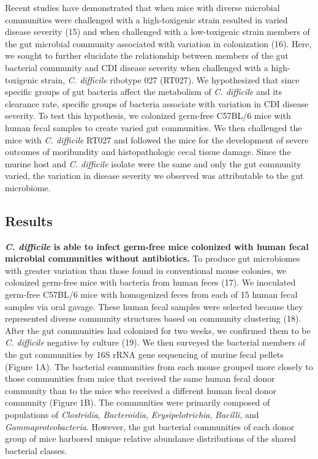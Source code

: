 \documentclass[
  12pt,
]{article}
\begin{document}
Recent studies have demonstrated that when mice with diverse microbial
communities were challenged with a high-toxigenic strain resulted in
varied disease severity (15) and when challenged with a low-toxigenic
strain members of the gut microbial community associated with variation
in colonization (16). Here, we sought to further elucidate the
relationship between members of the gut bacterial community and CDI
disease severity when challenged with a high-toxigenic strain, \emph{C.
difficile} ribotype 027 (RT027). We hypothesized that since specific
groups of gut bacteria affect the metabolism of \emph{C. difficile} and
its clearance rate, specific groups of bacteria associate with variation
in CDI disease severity. To test this hypothesis, we colonized germ-free
C57BL/6 mice with human fecal samples to create varied gut communities.
We then challenged the mice with \emph{C. difficile} RT027 and followed
the mice for the development of severe outcomes of moribundity and
histopathologic cecal tissue damage. Since the murine host and \emph{C.
difficile} isolate were the same and only the gut community varied, the
variation in disease severity we observed was attributable to the gut
microbiome.

\hypertarget{results}{%
\subsection{Results}\label{results}}

\textbf{\emph{C. difficile} is able to infect germ-free mice colonized
with human fecal microbial communities without antibiotics.} To produce
gut microbiomes with greater variation than those found in conventional
mouse colonies, we colonized germ-free mice with bacteria from human
feces (17). We inoculated germ-free C57BL/6 mice with homogenized feces
from each of 15 human fecal samples via oral gavage. These human fecal
samples were selected because they represented diverse community
structures based on community clustering (18). After the gut communities
had colonized for two weeks, we confirmed them to be \emph{C. difficile}
negative by culture (19). We then surveyed the bacterial members of the
gut communities by 16S rRNA gene sequencing of murine fecal pellets
(Figure 1A). The bacterial communities from each mouse grouped more
closely to those communities from mice that received the same human
fecal donor community than to the mice who received a different human
fecal donor community (Figure 1B). The communities were primarily
composed of populations of \emph{Clostridia}, \emph{Bacteroidia},
\emph{Erysipelotrichia}, \emph{Bacilli}, and \emph{Gammaproteobacteria}.
However, the gut bacterial communities of each donor group of mice
harbored unique relative abundance distributions of the shared bacterial
classes.
\end{document}
